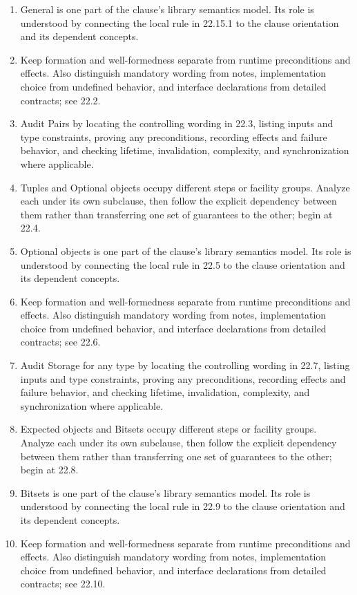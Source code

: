 \documentclass[11pt,letterpaper]{article}
\begin{document}
\begin{enumerate}
\item General is one part of the clause's library semantics model. Its role is understood by connecting the local rule in 22.15.1 to the clause orientation and its dependent concepts.
\item Keep formation and well-formedness separate from runtime preconditions and effects. Also distinguish mandatory wording from notes, implementation choice from undefined behavior, and interface declarations from detailed contracts; see 22.2.
\item Audit Pairs by locating the controlling wording in 22.3, listing inputs and type constraints, proving any preconditions, recording effects and failure behavior, and checking lifetime, invalidation, complexity, and synchronization where applicable.
\item Tuples and Optional objects occupy different steps or facility groups. Analyze each under its own subclause, then follow the explicit dependency between them rather than transferring one set of guarantees to the other; begin at 22.4.
\item Optional objects is one part of the clause's library semantics model. Its role is understood by connecting the local rule in 22.5 to the clause orientation and its dependent concepts.
\item Keep formation and well-formedness separate from runtime preconditions and effects. Also distinguish mandatory wording from notes, implementation choice from undefined behavior, and interface declarations from detailed contracts; see 22.6.
\item Audit Storage for any type by locating the controlling wording in 22.7, listing inputs and type constraints, proving any preconditions, recording effects and failure behavior, and checking lifetime, invalidation, complexity, and synchronization where applicable.
\item Expected objects and Bitsets occupy different steps or facility groups. Analyze each under its own subclause, then follow the explicit dependency between them rather than transferring one set of guarantees to the other; begin at 22.8.
\item Bitsets is one part of the clause's library semantics model. Its role is understood by connecting the local rule in 22.9 to the clause orientation and its dependent concepts.
\item Keep formation and well-formedness separate from runtime preconditions and effects. Also distinguish mandatory wording from notes, implementation choice from undefined behavior, and interface declarations from detailed contracts; see 22.10.

\end{enumerate}
\end{document}
